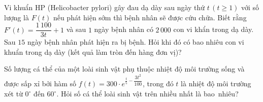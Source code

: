 \begin{bt}%
	Vi khuẩn HP (Helicobacter pylori) gây đau dạ dày sau ngày thứ $t\,(t \geq 1)$ với số lượng là $F(t)$ nếu phát hiện sớm thì bệnh nhân sẽ được cứu chữa. Biết rằng $F'(t)=\dfrac{1\,100}{3t}+1$ và sau $1$ ngày bệnh nhân có  $2\,000$ con vi khẩn trong dạ dày. Sau $15$ ngày bệnh nhân phát hiện ra bị bệnh. Hỏi khi đó có bao nhiêu con vi khuẩn trong dạ dày (kết quả làm tròn đến hàng đơn vị)?
\end{bt}

\begin{bt}%
	Số lượng cá thể của một loài sinh vật phụ thuộc nhiệt độ môi trường sống và được sấp xỉ bởi hàm số $f(t)=300 \cdot e^{\tfrac{t}{5}-\dfrac{3t^2}{100}}$, trong đó $t$ là nhiệt độ môi trường xét từ $0^{\circ}$  đến $60^{\circ}$. Hỏi số cá thể loài sinh vật trên nhiều nhất là bao~nhiêu?
\end{bt}

